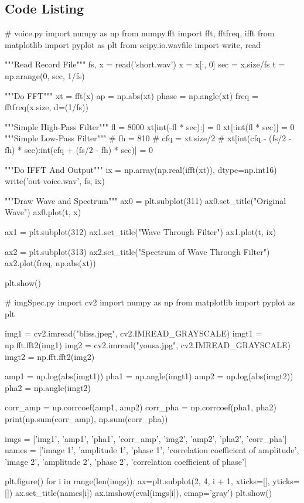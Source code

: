 \documentclass{article}
\begin{document}
\begin{appendices}
\section{Code Listing}
\begin{python}
# voice.py
import numpy as np
from numpy.fft import fft, fftfreq, ifft
from matplotlib import pyplot as plt
from scipy.io.wavfile import write, read

"""Read Record File"""
fs, x = read('short.wav')
x = x[:, 0]
sec = x.size/fs
t = np.arange(0, sec, 1/fs)

"""Do FFT"""
xt = fft(x)
ap = np.abs(xt)
phase = np.angle(xt)
freq = fftfreq(x.size, d=(1/fs))

"""Simple High-Pass Filter"""
fl = 8000
xt[int(-fl * sec):] = 0
xt[:int(fl * sec)] = 0
"""Simple Low-Pass Filter"""
# fh = 810
# cfq = xt.size/2
# xt[int(cfq - (fs/2 - fh) * sec):int(cfq + (fs/2 - fh) * sec)] = 0

"""Do IFFT And Output"""
ix = np.array(np.real(ifft(xt)), dtype=np.int16)
write('out-voice.wav', fs, ix)

"""Draw Wave and Spectrum"""
ax0 = plt.subplot(311)
ax0.set_title("Original Wave")
ax0.plot(t, x)

ax1 = plt.subplot(312) 
ax1.set_title("Wave Through Filter")
ax1.plot(t, ix)

ax2 = plt.subplot(313)
ax2.set_title("Spectrum of Wave Through Filter")
ax2.plot(freq, np.abs(xt))

plt.show()


\end{python}

\begin{python}
# imgSpec.py
import cv2
import numpy as np 
from matplotlib import pyplot as plt

img1 = cv2.imread("bliss.jpeg", cv2.IMREAD_GRAYSCALE)
imgt1 = np.fft.fft2(img1)
img2 = cv2.imread("yousa.jpg", cv2.IMREAD_GRAYSCALE)
imgt2 = np.fft.fft2(img2)

amp1 = np.log(abs(imgt1))
pha1 = np.angle(imgt1)
amp2 = np.log(abs(imgt2))
pha2 = np.angle(imgt2)

corr_amp = np.corrcoef(amp1, amp2)
corr_pha = np.corrcoef(pha1, pha2)
print(np.sum(corr_amp), np.sum(corr_pha))

imgs = ['img1', 'amp1', 'pha1', 'corr_amp', 'img2', 'amp2', 'pha2', 'corr_pha']
names = ['image 1', 'amplitude 1', 'phase 1', 'correlation coefficient of amplitude', 'image 2', 'amplitude 2', 'phase 2', 'correlation coefficient of phase']

plt.figure()
for i in range(len(imgs)):
    ax=plt.subplot(2, 4, i + 1, xticks=[], yticks=[])
    ax.set_title(names[i])
    ax.imshow(eval(imgs[i]), cmap='gray')
plt.show()
\end{python}
\end{appendices}
\end{document}
